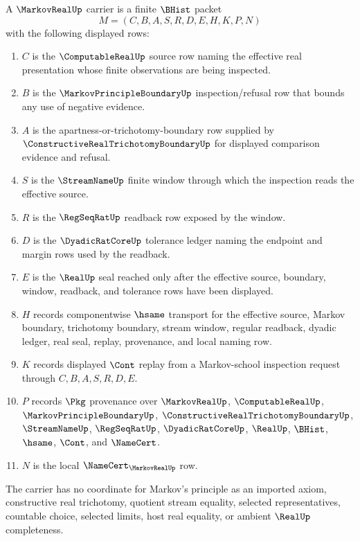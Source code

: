 \begin{definition}
\label{def:markov-real-carrier}
A $\MarkovRealUp$ carrier is a finite $\BHist$ packet
$$
M=(C,B,A,S,R,D,E,H,K,P,N)
$$
with the following displayed rows:
\begin{enumerate}
\item $C$ is the $\ComputableRealUp$ source row naming the effective real presentation whose finite observations are being inspected.
\item $B$ is the $\MarkovPrincipleBoundaryUp$ inspection/refusal row that bounds any use of negative evidence.
\item $A$ is the apartness-or-trichotomy-boundary row supplied by $\ConstructiveRealTrichotomyBoundaryUp$ for displayed comparison evidence and refusal.
\item $S$ is the $\StreamNameUp$ finite window through which the inspection reads the effective source.
\item $R$ is the $\RegSeqRatUp$ readback row exposed by the window.
\item $D$ is the $\DyadicRatCoreUp$ tolerance ledger naming the endpoint and margin rows used by the readback.
\item $E$ is the $\RealUp$ seal reached only after the effective source, boundary, window, readback, and tolerance rows have been displayed.
\item $H$ records componentwise $\hsame$ transport for the effective source, Markov boundary, trichotomy boundary, stream window, regular readback, dyadic ledger, real seal, replay, provenance, and local naming row.
\item $K$ records displayed $\Cont$ replay from a Markov-school inspection request through $C,B,A,S,R,D,E$.
\item $P$ records $\Pkg$ provenance over $\MarkovRealUp$, $\ComputableRealUp$, $\MarkovPrincipleBoundaryUp$, $\ConstructiveRealTrichotomyBoundaryUp$, $\StreamNameUp$, $\RegSeqRatUp$, $\DyadicRatCoreUp$, $\RealUp$, $\BHist$, $\hsame$, $\Cont$, and $\NameCert$.
\item $N$ is the local $\NameCert_{\MarkovRealUp}$ row.
\end{enumerate}
The carrier has no coordinate for Markov's principle as an imported axiom, constructive real trichotomy, quotient stream equality, selected representatives, countable choice, selected limits, host real equality, or ambient $\RealUp$ completeness.
\end{definition}


